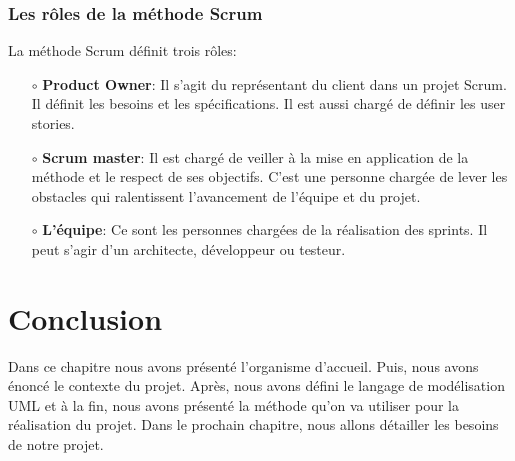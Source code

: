 \subsubsection{Les rôles de la méthode Scrum}
La méthode Scrum définit trois rôles:\\
\begin{itemize}
\item[$\circ$] \textbf{Product Owner}: Il s'agit du représentant du client dans un projet Scrum. Il définit les besoins et les spécifications. Il est aussi chargé de définir les user stories.\\
\item[$\circ$] \textbf{Scrum master}: Il est chargé de veiller à la mise en application de la méthode et le respect de ses objectifs. C'est une personne chargée de lever les obstacles qui ralentissent l'avancement de l'équipe et du projet.\\
\item[$\circ$] \textbf{L'équipe}: Ce sont les personnes chargées de la réalisation des sprints. Il peut s'agir d'un architecte, développeur ou testeur.
\end{itemize}
\section{Conclusion}
Dans ce chapitre nous avons présenté l'organisme d'accueil. Puis, nous avons énoncé le contexte du projet. Après, nous avons défini le langage de modélisation UML et à la fin, nous avons présenté la méthode qu'on va utiliser pour la réalisation du projet. Dans le prochain chapitre, nous allons détailler les besoins de notre projet.